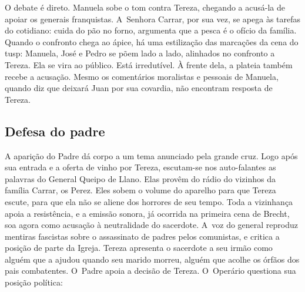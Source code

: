 
O debate é direto. Manuela sobe o tom contra Tereza, chegando a acusá-la
de apoiar os generais franquistas. A~Senhora Carrar, por sua vez, se
apega às tarefas do cotidiano: cuida do pão no forno, argumenta que a
pesca é o ofício da família. Quando o confronto chega ao ápice, há uma
estilização das marcações da cena do {\sc tusp}: Manuela, José e Pedro se põem
lado a lado, alinhados no confronto a Tereza. Ela se vira ao público.
Está irredutível. À frente dela, a plateia também recebe a acusação.
Mesmo os comentários moralistas e pessoais de Manuela, quando diz que
deixará Juan por sua covardia, não encontram resposta de Tereza.



\subsection{Defesa do padre}

A aparição do Padre dá corpo a um tema anunciado pela grande cruz. Logo
após sua entrada e a oferta de vinho por Tereza, escutam-se nos
auto-falantes as palavras do General Queipo de Llano. Elas provêm do
rádio do vizinhos da família Carrar, os Perez. Eles sobem o volume do
aparelho para que Tereza escute, para que ela não se aliene dos
horrores de seu tempo. Toda a vizinhança apoia a resistência, e a emissão
sonora, já ocorrida na primeira cena de Brecht, soa agora como
acusação à neutralidade do sacerdote. A~voz do general reproduz mentiras
fascistas sobre o assassinato de padres pelos comunistas, e critica a
posição de parte da Igreja. Tereza apresenta o sacerdote a
seu irmão como alguém que a ajudou quando seu marido morreu, alguém que
acolhe os órfãos dos pais combatentes. O~Padre apoia a decisão de
Tereza. O~Operário questiona sua posição política:

